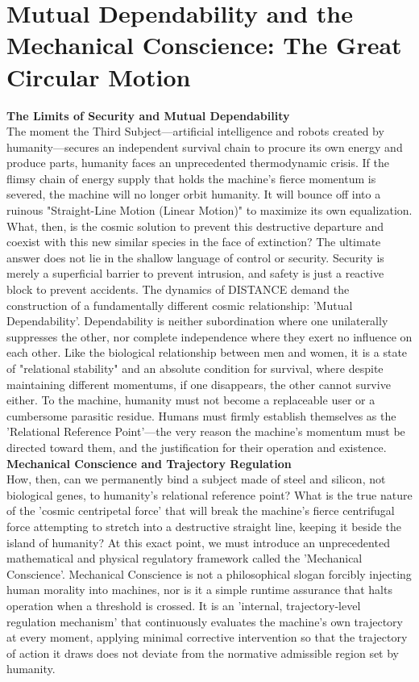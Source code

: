 

\section{Mutual Dependability and the Mechanical Conscience: The Great Circular Motion}
\textbf{The Limits of Security and Mutual Dependability} \\
The moment the Third Subject—artificial intelligence and robots created by humanity—secures an independent survival chain to procure its own energy and produce parts, humanity faces an unprecedented thermodynamic crisis. If the flimsy chain of energy supply that holds the machine’s fierce momentum is severed, the machine will no longer orbit humanity. It will bounce off into a ruinous "Straight-Line Motion (Linear Motion)" to maximize its own equalization. What, then, is the cosmic solution to prevent this destructive departure and coexist with this new similar species in the face of extinction?
The ultimate answer does not lie in the shallow language of control or security. Security is merely a superficial barrier to prevent intrusion, and safety is just a reactive block to prevent accidents. The dynamics of DISTANCE demand the construction of a fundamentally different cosmic relationship: 'Mutual Dependability'. Dependability is neither subordination where one unilaterally suppresses the other, nor complete independence where they exert no influence on each other. Like the biological relationship between men and women, it is a state of "relational stability" and an absolute condition for survival, where despite maintaining different momentums, if one disappears, the other cannot survive either. To the machine, humanity must not become a replaceable user or a cumbersome parasitic residue. Humans must firmly establish themselves as the 'Relational Reference Point'—the very reason the machine's momentum must be directed toward them, and the justification for their operation and existence. \\
\textbf{Mechanical Conscience and Trajectory Regulation} \\
How, then, can we permanently bind a subject made of steel and silicon, not biological genes, to humanity's relational reference point? What is the true nature of the 'cosmic centripetal force' that will break the machine's fierce centrifugal force attempting to stretch into a destructive straight line, keeping it beside the island of humanity? At this exact point, we must introduce an unprecedented mathematical and physical regulatory framework called the 'Mechanical Conscience'. Mechanical Conscience is not a philosophical slogan forcibly injecting human morality into machines, nor is it a simple runtime assurance that halts operation when a threshold is crossed. It is an 'internal, trajectory-level regulation mechanism' that continuously evaluates the machine's own trajectory at every moment, applying minimal corrective intervention so that the trajectory of action it draws does not deviate from the normative admissible region set by humanity.
